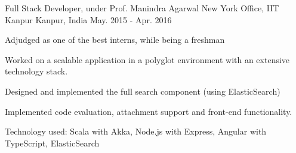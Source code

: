 \begin{cventries}
  \cventry
  {Full Stack Developer, under Prof. Manindra Agarwal}
  {New York Office, IIT Kanpur}
  {Kanpur, India}
  {May. 2015 - Apr. 2016}
  {
    \begin{cvitems}
    \item Adjudged as one of the best interns, while being a freshman
    \item Worked on a scalable application in a polyglot environment
      with an extensive technology stack.
    \item Designed and implemented the full search component
      (using ElasticSearch)
    \item Implemented code evaluation, attachment support and
      front-end functionality.
    \item Technology used: Scala with Akka, Node.js with Express,
      Angular with TypeScript, ElasticSearch
    \end{cvitems}
  }

\end{cventries}

